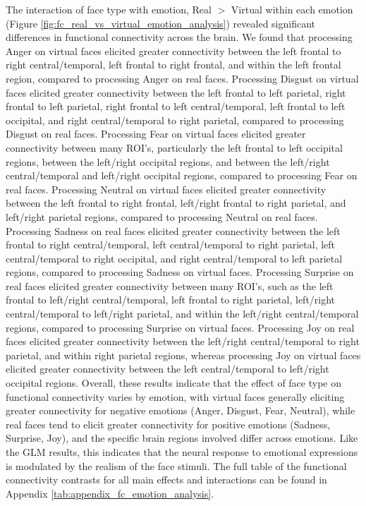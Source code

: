 The interaction of face type with emotion, Real $>$ Virtual within each emotion (Figure \ref{fig:fc_real_vs_virtual_emotion_analysis}) revealed significant differences in functional connectivity across the brain.
We found that processing Anger on virtual faces elicited greater connectivity between the left frontal to right central/temporal, left frontal to right frontal, and within the left frontal region, compared to processing Anger on real faces.
Processing Disgust on virtual faces elicited greater connectivity between the left frontal to left parietal, right frontal to left parietal, right frontal to left central/temporal, left frontal to left occipital, and right central/temporal to right parietal, compared to processing Disgust on real faces.
Processing Fear on virtual faces elicited greater connectivity between many ROI's, particularly the left frontal to left occipital regions, between the left/right occipital regions, and between the left/right central/temporal and left/right occipital regions, compared to processing Fear on real faces.
Processing Neutral on virtual faces elicited greater connectivity between the left frontal to right frontal, left/right frontal to right parietal, and left/right parietal regions, compared to processing Neutral on real faces.
Processing Sadness on real faces elicited greater connectivity between the left frontal to right central/temporal, left central/temporal to right parietal, left central/temporal to right occipital, and right central/temporal to left parietal regions, compared to processing Sadness on virtual faces.
Processing Surprise on real faces elicited greater connectivity between many ROI's, such as the left frontal to left/right central/temporal, left frontal to right parietal, left/right central/temporal to left/right parietal, and within the left/right central/temporal regions, compared to processing Surprise on virtual faces.
Processing Joy on real faces elicited greater connectivity between the left/right central/temporal to right parietal, and within right parietal regions, whereas processing Joy on virtual faces elicited greater connectivity between the left central/temporal to left/right occipital regions. 
Overall, these results indicate that the effect of face type on functional connectivity varies by emotion, with virtual faces generally eliciting greater connectivity for negative emotions (Anger, Disgust, Fear, Neutral), while real faces tend to elicit greater connectivity for positive emotions (Sadness, Surprise, Joy), and the specific brain regions involved differ across emotions.
Like the GLM results, this indicates that the neural response to emotional expressions is modulated by the realism of the face stimuli. 
The full table of the functional connectivity contrasts for all main effects and interactions can be found in Appendix \ref{tab:appendix_fc_emotion_analysis}.

